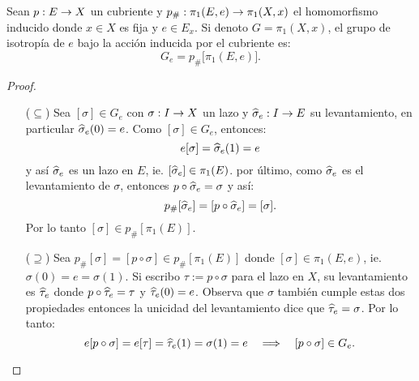 \begin{ejercicio}\label{ej:34}
  Sean $p:E\rightarrow X$ un cubriente y $p_{\#}:\pi_1(E,e)\rightarrow\pi_1(X,x)$ el homomorfismo inducido donde
  $x\in X$ es fija y $e\in E_x$. Si denoto $G=\pi_1(X,x)$, el grupo de isotrop\'ia de $e$ bajo la
  acci\'on inducida por el cubriente es:
  \[
    G_e=p_{\#}\big[\pi_1(E,e)\big].
  \]  
\end{ejercicio}
\begin{proof}$\;$\\ 
\begin{enumerate}
\item[($\subseteq$)] Sea $[\sigma]\in G_e$ con $\sigma:I\rightarrow X$ un lazo y $\widehat{ \sigma }_e:I\rightarrow E$
  su levantamiento, en particular $\widehat{ \sigma }_e(0)=e$. Como $[\sigma]\in G_e$, entonces:
  \[
    e[\sigma]=\widehat{ \sigma }_e(1)=e
  \]
  y as\'i $\widehat{ \sigma }_e$ es un lazo en $E$, ie. $[\widehat{ \sigma }_e]\in\pi_1(E)$. por \'ultimo,
  como $\widehat{ \sigma }_e$ es el levantamiento de $\sigma$, entonces $p\circ\widehat{ \sigma }_e=\sigma$
  y as\'i:
  \[
    p_{\#}[\widehat{ \sigma }_e]=[p\circ\widehat{ \sigma }_e]=[\sigma].
  \]
  Por lo tanto $[\sigma]\in p_{\#}[\pi_1(E)]$.
  
\item[($\supseteq$)] Sea $p_{\#}[\sigma]=[p\circ\sigma]\in p_{\#}[\pi_1(E)]$ donde
  $[\sigma]\in\pi_1(E,e)$, ie. $\sigma(0)=e=\sigma(1)$. Si escribo $\tau:=p\circ\sigma$ para
  el lazo en $X$, su levantamiento es $\widehat{ \tau }_e$ donde $p\circ\widehat{ \tau }_e=\tau$ y
  $\widehat{ \tau }_e(0)=e$. Observa que $\sigma$ tambi\'en cumple estas dos propiedades entonces
  la unicidad del levantamiento dice que $\widehat{ \tau }_e=\sigma$. Por lo tanto:
  \[
    e[p\circ\sigma]=e[\tau]=\widehat{ \tau }_e(1)=\sigma(1)=e \quad\Longrightarrow\quad
    [p\circ\sigma]\in G_e.
  \]
  
\end{enumerate}
\end{proof}%


